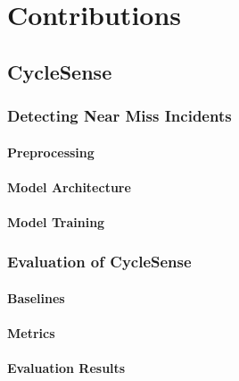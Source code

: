 \chapter{Contributions}
\label{cha:contributions}




\section{CycleSense}
\label{sec:cyclesense}



\subsection{Detecting Near Miss Incidents}
\label{sec:detecting_near_miss_incidents}


\subsubsection{Preprocessing}
\label{sec:preprocessing}

\subsubsection{Model Architecture}
\label{sec:model_architecture}

\subsubsection{Model Training}
\label{sec:model_training}


\subsection{Evaluation of CycleSense}
\label{sec:evaluation_cyclesense}


\subsubsection{Baselines}
\label{sec:baselines}

\subsubsection{Metrics}
\label{sec:metrics}

\subsubsection{Evaluation Results}
\label{sec:evaluation_results}



